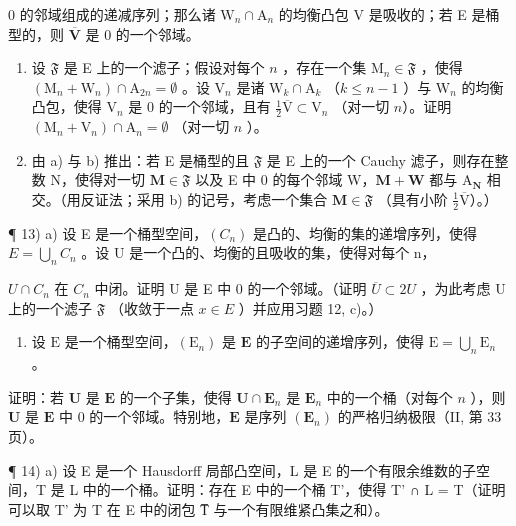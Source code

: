 0 的邻域组成的递减序列；那么诸 \(\mathrm{W}_n\cap \mathrm{A}_n\) 的均衡凸包 V 是吸收的；若 E 是桶型的，则 \(\overline{\mathbf{V}}\) 是 0 的一个邻域。

\begin{enumerate}
\def\labelenumi{\alph{enumi})}
\setcounter{enumi}{1}
\item
  设 \(\mathfrak{F}\) 是 E 上的一个滤子；假设对每个 \(n\) ，存在一个集 \(\mathrm{M}_n \in \mathfrak{F}\) ，使得 \((\mathrm{M}_n + \mathrm{W}_n) \cap \mathrm{A}_{2n} = \emptyset\) 。设 \(\mathrm{V}_n\) 是诸 \(\mathrm{W}_k \cap \mathrm{A}_k\) （\(k \leqslant n - 1\) ）与 \(\mathrm{W}_n\) 的均衡凸包，使得 \(\mathrm{V}_n\) 是 0 的一个邻域，且有 \(\frac{1}{2}\overline{\mathrm{V}} \subset \mathrm{V}_n\) （对一切 \(n\)）。证明 \((\mathrm{M}_n + \mathrm{V}_n) \cap \mathrm{A}_n = \emptyset\) （对一切 \(n\) ）。
\item
  由 a) 与 b) 推出：若 E 是桶型的且 \(\mathfrak{F}\) 是 E 上的一个 Cauchy 滤子，则存在整数 N，使得对一切 \(\mathbf{M} \in \mathfrak{F}\) 以及 E 中 0 的每个邻域 W，\(\mathbf{M} + \mathbf{W}\) 都与 \(\mathrm{A}_{\mathbf{N}}\) 相交。（用反证法；采用 b) 的记号，考虑一个集合 \(\mathbf{M} \in \mathfrak{F}\) （具有小阶 \(\frac{1}{2}\overline{\mathrm{V}}\)）。）
\end{enumerate}

¶ 13) a) 设 E 是一个桶型空间，\((C_n)\) 是凸的、均衡的集的递增序列，使得 \(E = \bigcup_{n} C_n\) 。设 U 是一个凸的、均衡的且吸收的集，使得对每个 n，

\(U \cap C_{n}\) 在 \(C_{n}\) 中闭。证明 U 是 E 中 0 的一个邻域。（证明 \(\overline{U} \subset 2U\) ，为此考虑 U 上的一个滤子 \(\mathfrak{F}\) （收敛于一点 \(x \in E\) ）并应用习题 12, c)。）

\begin{enumerate}
\def\labelenumi{\alph{enumi})}
\setcounter{enumi}{1}
\tightlist
\item
  设 \(\mathrm{E}\) 是一个桶型空间，\((\mathrm{E}_n)\) 是 \(\mathbf{E}\) 的子空间的递增序列，使得 \(\mathrm{E} = \bigcup_{n} \mathrm{E}_n\) 。
\end{enumerate}

证明：若 \(\mathbf{U}\) 是 \(\mathbf{E}\) 的一个子集，使得 \(\mathbf{U} \cap \mathbf{E}_n\) 是 \(\mathbf{E}_n\) 中的一个桶（对每个 \(n\) ），则 \(\mathbf{U}\) 是 \(\mathbf{E}\) 中 0 的一个邻域。特别地，\(\mathbf{E}\) 是序列 \((\mathbf{E}_n)\) 的严格归纳极限（II, 第 33 页）。

¶ 14) a) 设 E 是一个 Hausdorff 局部凸空间，L 是 E 的一个有限余维数的子空间，T 是 L 中的一个桶。证明：存在 E 中的一个桶 T'，使得 T' ∩ L = T（证明可以取 T' 为 T 在 E 中的闭包 T̅ 与一个有限维紧凸集之和）。

